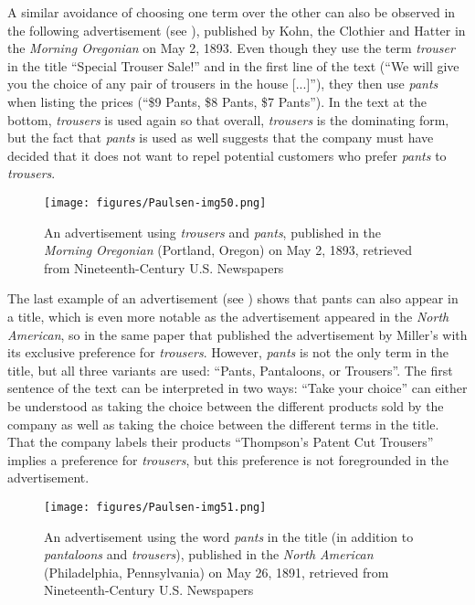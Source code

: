 A similar avoidance of choosing one term over the other can also be observed in the following advertisement (see ), published by Kohn, the Clothier and Hatter in the \emph{Morning Oregonian} on May 2, 1893. Even though they use the term \emph{trouser} in the title “Special Trouser Sale!” and in the first line of the text (“We will give you the choice of any pair of trousers in the house [...]”), they then use \emph{pants} when listing the prices (“\$9 Pants, \$8 Pants, \$7 Pants”). In the text at the bottom, \emph{trousers} is used again so that overall, \emph{trousers} is the dominating form, but the fact that \emph{pants} is used as well suggests that the company must have decided that it does not want to repel potential customers who prefer \emph{pants} to \emph{trousers}.


\begin{figure}[t]
\texttt{[image: figures/Paulsen-img50.png]}
\caption{
An advertisement using \emph{trousers} and \emph{pants}, published in the \emph{Morning Oregonian} (Portland, Oregon) on May 2, 1893, retrieved from Nineteenth-Century U.S. Newspapers
}
\label{fig:key:50}
\end{figure}
The last example of an advertisement (see ) shows that pants can also appear in a title, which is even more notable as the advertisement appeared in the \emph{North American}, so in the same paper that published the advertisement by Miller’s with its exclusive preference for \emph{trousers}. However, \emph{pants} is not the only term in the title, but all three variants are used: “Pants, Pantaloons, or Trousers”. The first sentence of the text can be interpreted in two ways: “Take your choice” can either be understood as taking the choice between the different products sold by the company as well as taking the choice between the different terms in the title. That the company labels their products “Thompson’s Patent Cut Trousers” implies a preference for \emph{trousers}, but this preference is not foregrounded in the advertisement.

\begin{figure}
\texttt{[image: figures/Paulsen-img51.png]}
\caption{
An advertisement using the word \emph{pants} in the title (in addition to \emph{pantaloons} and \emph{trousers}), published in the \emph{North American} (Philadelphia, Pennsylvania) on May 26, 1891, retrieved from Nineteenth-Century U.S. Newspapers
}
\label{fig:key:51}
\end{figure}

